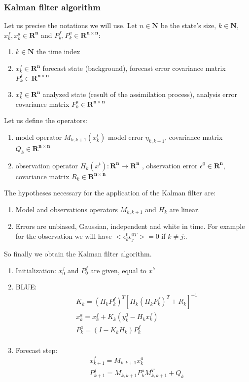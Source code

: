 \subsubsection{Kalman filter algorithm}
Let us precise the notations we will use.
\newline
\noindent Let $n\in \mathbf{N}$ be the state's size, $k\in \mathbf{N}$, $x_k^f ,x_k^a\in \mathbf{R^n}$ and $P_k^f,P_k^a \in \mathbf{R^{n\times n}}$:
 \begin{enumerate}[label=\textbullet]
		\item $k\in \mathbf{N} $ the time index
		\item $x_{k}^{f}\in \mathbf{R^n}$ forecast state (background), forecast error covariance matrix $P_{k}^{f}\in \mathbf{R^{n\times n}}$
		\item $x_{k}^{a}\in \mathbf{R^n}$ analyzed state (result of the assimilation process), analysis error covariance matrix $P_{k}^{a}\in \mathbf{R^{n\times n}}$
	\end{enumerate}
\noindent Let us define the operators:
    \begin{enumerate}[label=\textbullet]
		\item model operator $ M_{k,k+1}(x_{k}^{t}) $ model error $\eta
		_{k,k+1}$, covariance matrix $Q_k\in \mathbf{R^{n\times n}}$
		\item observation operator $ H_k (x^t ): \mathbf{R^n} \rightarrow \mathbf{R^n} $ , observation error $\epsilon^0\in \mathbf{R^n}$, covariance matrix $R_k\in \mathbf{R^{n\times n}}$
	\end{enumerate}
\noindent The hypotheses necessary for the application of the Kalman filter are:
    \begin{enumerate}[label=\textbullet]
		\item Model and observations operators $M_{k,k+1}$ and $H_k$ are linear.
		\item Errors are unbiased, Gaussian, independent and white in time. For example for the observation we will have $<\epsilon_k^0\epsilon_j^{0T}>=0$ if $k\ne j$:.
	\end{enumerate}
So finally we obtain the Kalman filter algorithm.
\begin{enumerate}[label=(\roman*)]
\item Initialization: $x_0^f$ and $P_0^f$ are given, equal to $x^b$ 
\item BLUE:
$$\begin{aligned} &K_k=(H_kP_k^f)^T[H_k(H_kP_k^f)^T+R_k]^{-1} \\
&x_k^a=x_k^f+K_k(y_k^0-H_kx_k^f) \\
&P_k^a=(I-K_kH_k)P_k^f \\
\end{aligned}$$
\item Forecast step:
$$\begin{aligned} 
&x_{k+1}^f=M_{k,k+1}x_k^a \\
&P_{k+1}^f=M_{k,k+1}P_k^aM_{k,k+1}^T+Q_k\\
\end{aligned}$$
\end{enumerate}

